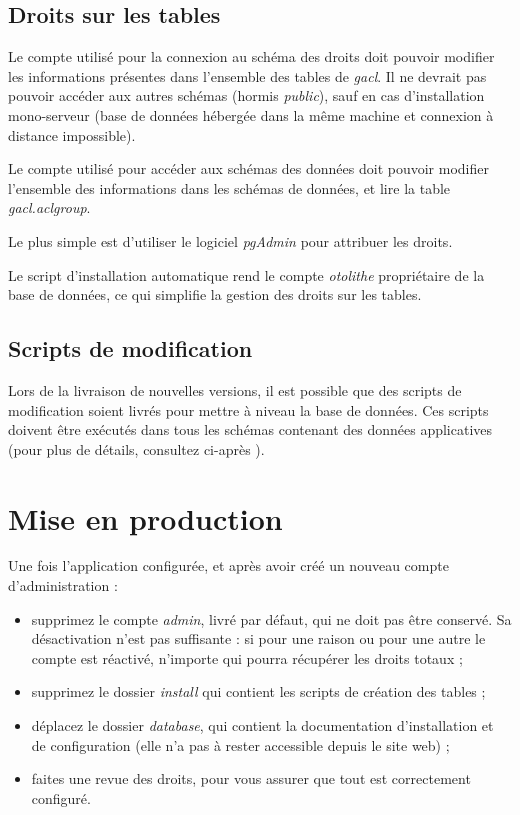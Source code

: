 \subsection{Droits sur les tables}

Le compte utilisé pour la connexion au schéma des droits doit pouvoir modifier les informations présentes dans l'ensemble des tables de \textit{gacl}. Il ne devrait pas pouvoir accéder aux autres schémas (hormis \textit{public}), sauf en cas d'installation mono-serveur (base de données hébergée dans la même machine et connexion à distance impossible).

Le compte utilisé pour accéder aux schémas des données doit pouvoir modifier l'ensemble des informations dans les schémas de données, et lire la table \textit{gacl.aclgroup}.

Le plus simple est d'utiliser le logiciel \textit{pgAdmin} \cite{pgadmin} pour attribuer les droits.

Le script d'installation automatique rend le compte \textit{otolithe} propriétaire de la base de données, ce qui simplifie la gestion des droits sur les tables.

\subsection{Scripts de modification}

Lors de la livraison de nouvelles versions, il est possible que des scripts de modification soient livrés pour mettre à niveau la base de données. Ces scripts doivent être exécutés dans tous les schémas contenant des données applicatives (pour plus de détails, consultez ci-après \textit{}).

\section{Mise en production}

Une fois l'application configurée, et après avoir créé un nouveau compte d'administration :
\begin{itemize}
\item supprimez le compte \textit{admin}, livré par défaut, qui ne doit pas être conservé. Sa désactivation n'est pas suffisante : si pour une raison ou pour une autre le compte est réactivé, n'importe qui pourra récupérer les droits totaux ;
\item supprimez le dossier \textit{install} qui contient les scripts de création des tables ;
\item déplacez le dossier \textit{database}, qui contient la documentation d'installation et de configuration (elle n'a pas à rester accessible depuis le site web) ;
\item faites une revue des droits, pour vous assurer que tout est correctement configuré.
\end{itemize}

